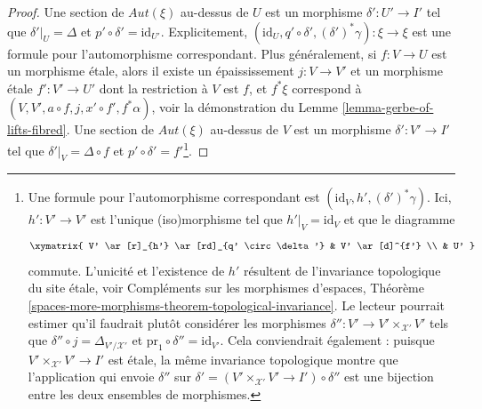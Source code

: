 \begin{proof}
\medskip\noindent
Une section de $\mathit{Aut}(\xi)$ au-dessus de $U$ est un morphisme $\delta' : U' \to I'$
tel que $\delta'|_U = \Delta$ et
$p' \circ \delta' = \text{id}_{U'}$. Explicitement,
$(\text{id}_U, q' \circ \delta', (\delta')^*\gamma) : \xi \to \xi$
est une formule pour l'automorphisme correspondant.
Plus généralement, si
$f : V \to U$ est un morphisme \'etale, alors il existe un épaississement
$j : V \to V'$ et un morphisme \'etale
$f' : V' \to U'$ dont la restriction à $V$ est $f$, et $f^*\xi$
correspond à $(V, V', a \circ f, j, x' \circ f', f^*\alpha)$, voir la démonstration du
Lemme \ref{lemma-gerbe-of-lifts-fibred}.
Une section de $\mathit{Aut}(\xi)$ au-dessus de $V$ est un morphisme
$\delta' : V' \to I'$
tel que $\delta'|_V = \Delta \circ f$
et $p' \circ \delta' = f'$\footnote{Une formule pour l'automorphisme
correspondant est $(\text{id}_V, h', (\delta')^*\gamma)$.
Ici, $h' : V' \to V'$ est l'unique (iso)morphisme tel que
$h'|_V = \text{id}_V$ et que le diagramme
$$
\xymatrix{
V' \ar[r]_{h'} \ar[rd]_{q' \circ \delta'} & V' \ar[d]^{f'} \\
& U'
}
$$
commute. L'unicité et l'existence de $h'$ résultent de l'invariance topologique
du site \'etale, voir Compléments sur les morphismes d'espaces,
Théorème \ref{spaces-more-morphisms-theorem-topological-invariance}.
Le lecteur pourrait estimer qu'il faudrait plutôt considérer les morphismes
$\delta'' : V' \to V' \times_{\mathcal{X}'} V'$ tels que
$\delta'' \circ j = \Delta_{V'/\mathcal{X}'}$ et
$\text{pr}_1 \circ \delta'' = \text{id}_{V'}$.
Cela conviendrait également : puisque $V' \times_{\mathcal{X}'} V' \to I'$ est \'etale,
la même invariance topologique montre que l'application qui envoie
$\delta''$ sur $\delta' = (V' \times_{\mathcal{X}'} V' \to I') \circ \delta''$
est une bijection entre les deux
ensembles de morphismes.}.


\end{proof}
